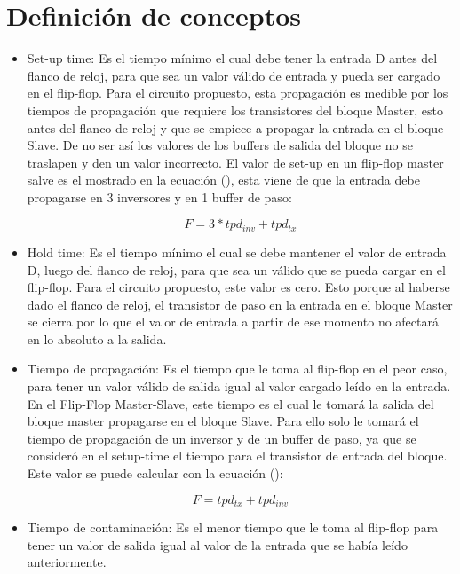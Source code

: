 \documentclass[12pt,a4paper]{article} %
\begin{document}
\section{Definición de conceptos}

\begin{itemize}
\item Set-up time: Es el tiempo mínimo el cual debe tener la entrada D antes del flanco de reloj, para que sea un valor válido de entrada y pueda ser cargado en el flip-flop. 
Para el circuito propuesto, esta propagación es medible por los tiempos de propagación que requiere los transistores del bloque Master, esto antes del flanco de reloj y que se empiece a propagar la entrada en el bloque Slave. De no ser así los valores de los buffers de salida del bloque no se traslapen y den un valor incorrecto. 
El valor de set-up en un flip-flop master salve es el mostrado en la ecuación (), esta viene de que la entrada debe propagarse en 3 inversores y en 1 buffer de paso:

\begin{equation}\label{eqn:set_up}
F=3 *tpd _{inv} + tpd _{tx}
\end{equation}

\item Hold time: Es el tiempo mínimo el cual se debe mantener el valor de entrada D, luego del flanco de reloj, para que sea un válido que se pueda cargar en el flip-flop.
Para el circuito propuesto, este valor es cero. Esto porque al haberse dado el flanco de reloj, el transistor de paso en la entrada en el bloque Master se cierra por lo que el valor de entrada a partir de ese momento no afectará en lo absoluto a la salida. 

\item Tiempo de propagación: Es el tiempo que le toma al flip-flop en el peor caso, para tener un valor válido de salida igual al valor cargado leído en la entrada.
En el Flip-Flop Master-Slave, este tiempo es el cual le tomará la salida del bloque master propagarse en el bloque Slave. Para ello solo le tomará el tiempo de propagación de un inversor y de un buffer de paso, ya que se consideró en el setup-time el tiempo para el transistor de entrada del bloque.
Este valor se puede calcular con la ecuación (): 

\begin{equation}\label{eqn:propagacion}
F=tpd_{tx} + tpd_{inv}
\end{equation}

\item Tiempo de contaminación: Es el menor tiempo que le toma al flip-flop para tener un valor de salida igual al valor de la entrada que se había leído anteriormente.

\end{itemize}
\end{document}
